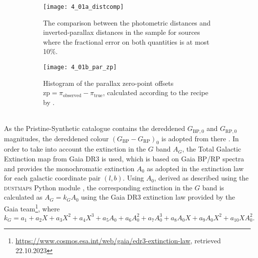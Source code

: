 \documentclass[a4paper,11pt]{article}
\begin{document}
\begin{figure}[h]
 \centering
 \begin{minipage}[c]{0.49\textwidth}
 \begin{subfigure}[b]{\linewidth}
  \centering
  \texttt{[image: 4\_01a\_distcomp]}
  \caption{The comparison between the photometric distances and inverted-parallax distances in the sample for sources where the fractional error on both quantities is at most 10\%.}
  \label{fig:distcomp}
 \end{subfigure}
 \end{minipage}\hfill
 \begin{minipage}[c]{0.5\textwidth}
 \begin{subfigure}[b]{\linewidth}
  \centering
  \texttt{[image: 4\_01b\_par\_zp]}
  \caption{Histogram of the parallax zero-point offsets $\mathrm{zp}=\pi_\mathrm{observed}-\pi_\mathrm{true}$, calculated according to the recipe by \citet{lindegren21b}.}
  \label{fig:parallax_zp}
 \end{subfigure}
 \end{minipage}
 \caption[Photometric vs. parallax distances; parallax zero-point offsets]{}
\end{figure}\\
%
As the Pristine-Synthetic catalogue contains the dereddened $G_\mathrm{BP,0}$ and $G_\mathrm{RP,0}$ magnitudes, the dereddened colour $(G_\mathrm{BP}-G_\mathrm{RP})_0$ is adopted from there \citep{pristinegaia}. In order to take into account the extinction in the $G$ band $A_G$, the Total Galactic Extinction map from Gaia DR3 is used, which is based on Gaia BP/RP spectra \citep{delchambre23} and provides the monochromatic extinction $A_0$ as adopted in the \citet{fitzpatrick99} extinction law for each galactic coordinate pair $(l,b)$. Using $A_0$, derived as described using the \textsc{dustmaps} Python module \citep{dustmaps}, the corresponding extinction in the $G$ band is calculated as $A_G=k_GA_0$ using the Gaia DR3 extinction law provided by the Gaia team\footnote{\url{https://www.cosmos.esa.int/web/gaia/edr3-extinction-law}, retrieved 22.10.2023}, where
%
\begin{equation}
 k_G=a_1+a_2X+a_3X^2+a_4X^3+a_5A_0+a_6A_0^2+a_7A_0^3+a_8A_0X+a_9A_0X^2+a_{10}XA_0^2.
\end{equation}
%
\end{document}
